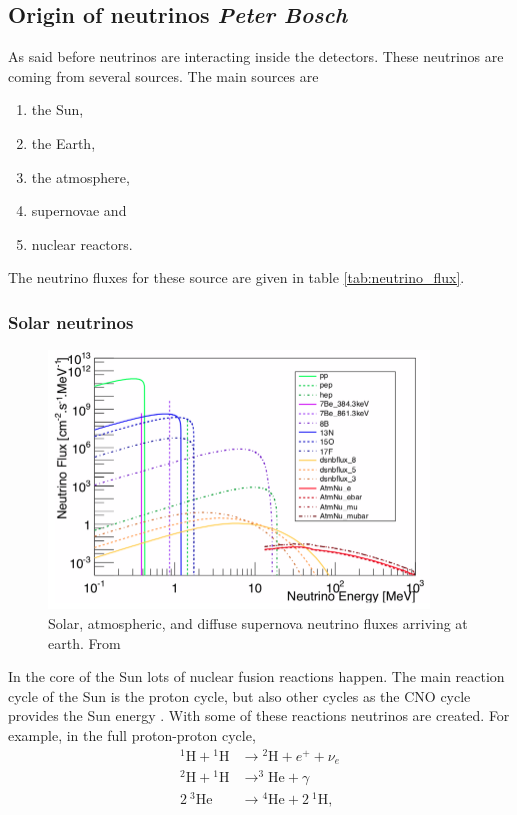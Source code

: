 \documentclass{article}
\begin{document}
\subsection{Origin of neutrinos \small{\textit{Peter Bosch}}}
As said before neutrinos are interacting inside the detectors. These neutrinos are coming from several sources. The main sources are
\begin{enumerate}
    \item the Sun,
    \item the Earth,
    \item the atmosphere,
    \item supernovae and
    \item nuclear reactors.
\end{enumerate}
The neutrino fluxes for these source are given in table \ref{tab:neutrino_flux}.

\subsubsection{Solar neutrinos}
\begin{figure}[h!]
    \centering
    \includegraphics[width = 0.9\textwidth]{Plot_neutrino_flux.png}
    \caption{Solar, atmospheric, and diffuse supernova neutrino fluxes arriving at earth. From \cite{Billard:2013qya}}
    \label{fig:neutrino_flux}
\end{figure}

In the core of the Sun lots of nuclear fusion reactions happen. The main reaction cycle of the Sun is the proton cycle, but also other cycles as the CNO cycle provides the Sun energy \cite{Bonventre:2018hyd}. With some of these reactions neutrinos are created. For example, in the full proton-proton cycle,
\begin{align}
    {}^1\text{H}+{}^1\text{H}&\rightarrow {}^2\text{H}+e^++\nu_e \nonumber\\
    {}^2\text{H} + {}^1\text{H} &\rightarrow ^3\text{He}+\gamma \nonumber\\
    2\ {}^3\text{He} &\rightarrow {}^4\text{He}+2\ {}^1\text{H},
\end{align}
\end{document}
